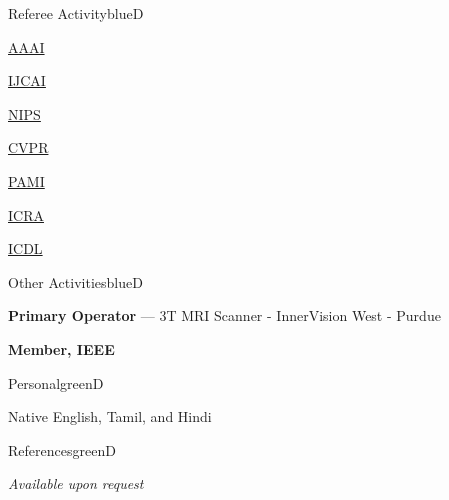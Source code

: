 \documentclass[a4paper]{article}
\def\item{\addtocounter{enumi}{-2}\oldItem}
\begin{document}

\begin{region}{Referee Activity}{blueD}
\item
  \begin{multicols}{8}
    \begin{itemize}
    \item \href{http://www.aaai.org/home.html}{AAAI}
    \item \href{http://ijcai-16.org/}{IJCAI}
    \item \href{http://nips.cc/}{NIPS}
    \item \href{http://www.pamitc.org/cvpr14/}{CVPR}
    \item \href{http://www.computer.org/portal/web/tpami}{PAMI}
    \item \href{http://www.icra2014.com/}{ICRA}
    \item \href{http://www.icdl-epirob.org/}{ICDL}
    \end{itemize}
  \end{multicols}
\end{region}


\begin{region}{Other Activities}{blueD}
\item \textbf{Primary Operator} --- 3T MRI Scanner - InnerVision West - Purdue
\item \textbf{Member, IEEE} %
\end{region}

\begin{region}{Personal}{greenD}
\item Native English, Tamil, and Hindi
\end{region}

\begin{region}{References}{greenD}
\item \textsl{Available upon request}
\end{region}
\end{document}
